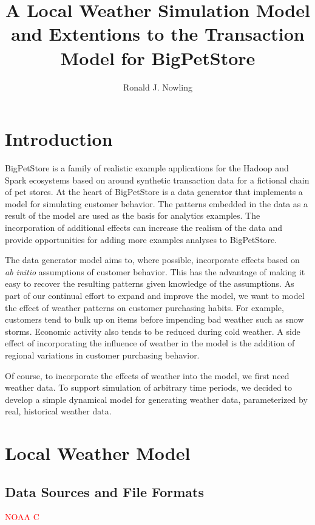\documentclass[11pt, letterpaper]{article}
\begin{document}
\title{A Local Weather Simulation Model and Extentions to the Transaction Model for BigPetStore}
\author{Ronald J. Nowling}

\maketitle

\newpage

\tableofcontents

\newpage

\section{Introduction}
BigPetStore is a family of realistic example applications for the Hadoop and Spark ecosystems based on around synthetic transaction data for a fictional chain of pet stores.  At the heart of BigPetStore is a data generator that implements a model for simulating customer behavior.  The patterns embedded in the data as a result of the model are used as the basis for analytics examples.  The incorporation of additional effects can increase the realism of the data and provide opportunities for adding more examples analyses to BigPetStore.

The data generator model aims to, where possible, incorporate effects based on \emph{ab initio} assumptions of customer behavior.  This has the advantage of making it easy to recover the resulting patterns given knowledge of the assumptions.  As part of our continual effort to expand and improve the model, we want to model the effect of weather patterns on customer purchasing habits.  For example, customers tend to bulk up on items before impending bad weather such as snow storms.  Economic activity also tends to be reduced during cold weather.  A side effect of incorporating the influence of weather in the model is the addition of regional variations in customer purchasing behavior.

Of course, to incorporate the effects of weather into the model, we first need weather data. To support simulation of arbitrary time periods, we decided to develop a simple dynamical model for generating weather data, parameterized by real, historical weather data.

\newpage
\section{Local Weather Model}

\subsection{Data Sources and File Formats}
\textcolor{red}{NOAA C}
\end{document}
